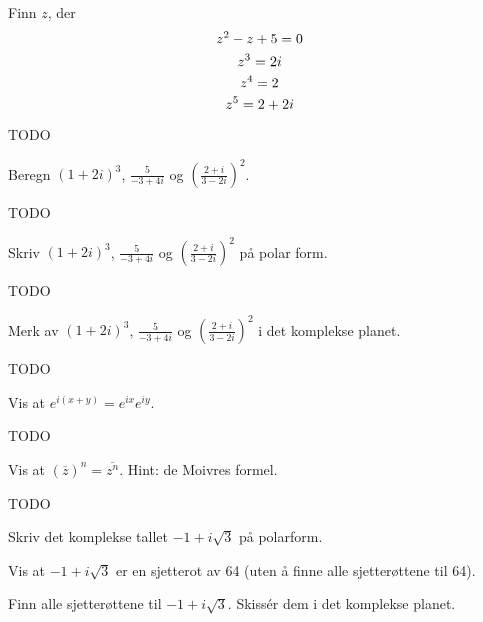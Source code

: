 
\begin{oppgave}
Finn $z$, der
\[
z^2-z+5=0 \\
\]
\[
z^3=2i \\
\]
\[
z^4=2 \\
\]
\[
z^5=2+2i \\
\]
\end{oppgave}

\begin{losning}
TODO
\end{losning}


\begin{oppgave}
Beregn $(1+2i)^3$, $\frac{5}{-3+4i}$ og $\left(\frac{2+i}{3-2i}\right)^2$.
\end{oppgave}

\begin{losning}
TODO
\end{losning}


\begin{oppgave}
Skriv $(1+2i)^3$, $\frac{5}{-3+4i}$ og $\left(\frac{2+i}{3-2i}\right)^2$ på polar form.
\end{oppgave}

\begin{losning}
TODO
\end{losning}


\begin{oppgave}
Merk av $(1+2i)^3$, $\frac{5}{-3+4i}$ og $\left(\frac{2+i}{3-2i}\right)^2$ i det komplekse planet.
\end{oppgave}

\begin{losning}
TODO
\end{losning}


\begin{oppgave}
Vis at $e^{i(x+y)}=e^{ix}e^{iy}$.
\end{oppgave}

\begin{losning}
TODO
\end{losning}


\begin{oppgave}
Vis at $(\overline z)^n=\overline{z^n}$. Hint: de Moivres formel.
\end{oppgave}


\begin{losning}
TODO
\end{losning}




\begin{oppgave}
\begin{punkt}
Skriv det komplekse tallet $-1+i\sqrt{3}$ på polarform.
\end{punkt}

\begin{punkt}
Vis at $-1+i\sqrt{3}$ er en sjetterot av 64 (uten å finne alle sjetterøttene til 64).
\end{punkt}

\begin{punkt}
Finn alle sjetterøttene til $-1+i\sqrt{3}$. Skissér dem i det komplekse planet.
\end{punkt}

\end{oppgave}


